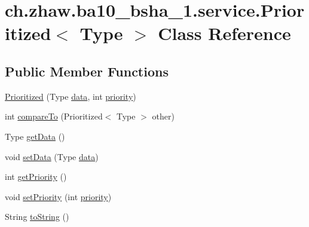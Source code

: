 \hypertarget{classch_1_1zhaw_1_1ba10__bsha__1_1_1service_1_1Prioritized_3_01Type_01_4}{
\section{ch.zhaw.ba10\_\-bsha\_\-1.service.Prioritized$<$ Type $>$ Class Reference}
\label{classch_1_1zhaw_1_1ba10__bsha__1_1_1service_1_1Prioritized_3_01Type_01_4}
}
\subsection*{Public Member Functions}
\begin{DoxyCompactItemize}
\item 
\hyperlink{classch_1_1zhaw_1_1ba10__bsha__1_1_1service_1_1Prioritized_3_01Type_01_4_a391e270fbbf82fc8cc9ef250b14dd4e3}{Prioritized} (Type \hyperlink{classch_1_1zhaw_1_1ba10__bsha__1_1_1service_1_1Prioritized_3_01Type_01_4_ac981f72cd0ff5d5ad2b9505b95e6cb27}{data}, int \hyperlink{classch_1_1zhaw_1_1ba10__bsha__1_1_1service_1_1Prioritized_3_01Type_01_4_aac367233c3f10ee7df9855347d2e5e7b}{priority})
\item 
int \hyperlink{classch_1_1zhaw_1_1ba10__bsha__1_1_1service_1_1Prioritized_3_01Type_01_4_a6ffb80433ea5b02e9bbd4c65c2011659}{compareTo} (Prioritized$<$ Type $>$ other)
\item 
Type \hyperlink{classch_1_1zhaw_1_1ba10__bsha__1_1_1service_1_1Prioritized_3_01Type_01_4_a57010060e23323437b3609b2d4f26466}{getData} ()
\item 
void \hyperlink{classch_1_1zhaw_1_1ba10__bsha__1_1_1service_1_1Prioritized_3_01Type_01_4_a8ad6a5c7b6b3c485a38e976543b1d11c}{setData} (Type \hyperlink{classch_1_1zhaw_1_1ba10__bsha__1_1_1service_1_1Prioritized_3_01Type_01_4_ac981f72cd0ff5d5ad2b9505b95e6cb27}{data})
\item 
int \hyperlink{classch_1_1zhaw_1_1ba10__bsha__1_1_1service_1_1Prioritized_3_01Type_01_4_a10f654cdff9cc8fbdc4614b8994cf777}{getPriority} ()
\item 
void \hyperlink{classch_1_1zhaw_1_1ba10__bsha__1_1_1service_1_1Prioritized_3_01Type_01_4_a845e2a103ad9ad90bcbd7c2af29883b9}{setPriority} (int \hyperlink{classch_1_1zhaw_1_1ba10__bsha__1_1_1service_1_1Prioritized_3_01Type_01_4_aac367233c3f10ee7df9855347d2e5e7b}{priority})
\item 
String \hyperlink{classch_1_1zhaw_1_1ba10__bsha__1_1_1service_1_1Prioritized_3_01Type_01_4_a74474d05201ad576585d29eeab69de45}{toString} ()
\end{DoxyCompactItemize}
